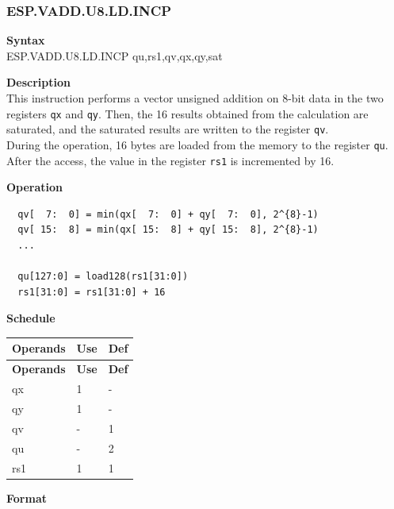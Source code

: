 \newpage
\subsubsection{ESP.VADD.U8.LD.INCP}\label{instruction:ESPVADDU8LDINCP}
\textbf{Syntax}\\
ESP.VADD.U8.LD.INCP qu,rs1,qv,qx,qy,sat

\textbf{Description}\\
This instruction performs a vector unsigned addition on 8-bit data in the two registers \lstinline{qx} and \lstinline{qy}. Then, the 16 results obtained from the calculation are saturated, and the saturated results are written to the register \lstinline{qv}. \\ During the operation, 16 bytes are loaded from the memory to the register \lstinline{qu}. After the access, the value in the register \lstinline{rs1} is incremented by 16.

\textbf{Operation}\\
\begin{lstlisting}
  qv[  7:  0] = min(qx[  7:  0] + qy[  7:  0], 2^{8}-1)
  qv[ 15:  8] = min(qx[ 15:  8] + qy[ 15:  8], 2^{8}-1)
  ...

  qu[127:0] = load128(rs1[31:0])
  rs1[31:0] = rs1[31:0] + 16
\end{lstlisting}


\textbf{Schedule}\\
\begin{longtable}[c]{|l|l|l|}
    \hline
    \rowcolor{lightgray}
    \textbf{Operands} & \textbf{Use} & \textbf{Def} \\\hline
    \endfirsthead
    \hline
    \rowcolor{lightgray}
     \textbf{Operands} & \textbf{Use} & \textbf{Def} \\\hline
    \endhead
    \hline
    \endfoot

    qx & 1 & - \\\hline
  qy & 1 & - \\\hline
     qv & - & 1 \\\hline
     qu & - & 2 \\\hline
     rs1 & 1 & 1

\end{longtable}

\textbf{Format}\\

